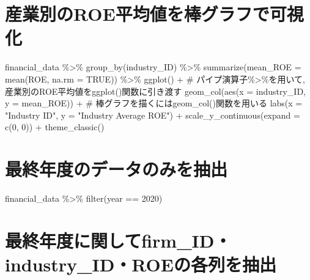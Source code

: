 \documentclass[
  letterpaper,
  DIV=11,
  numbers=noendperiod]{scrreprt}
\newenvironment{Shaded}{\begin{snugshade}}{\end{snugshade}}
\newcommand{\AttributeTok}[1]{\textcolor[rgb]{0.40,0.45,0.13}{#1}}
\newcommand{\CommentTok}[1]{\textcolor[rgb]{0.37,0.37,0.37}{#1}}
\newcommand{\ConstantTok}[1]{\textcolor[rgb]{0.56,0.35,0.01}{#1}}
\newcommand{\DecValTok}[1]{\textcolor[rgb]{0.68,0.00,0.00}{#1}}
\newcommand{\FunctionTok}[1]{\textcolor[rgb]{0.28,0.35,0.67}{#1}}
\newcommand{\NormalTok}[1]{\textcolor[rgb]{0.00,0.23,0.31}{#1}}
\newcommand{\SpecialCharTok}[1]{\textcolor[rgb]{0.37,0.37,0.37}{#1}}
\newcommand{\StringTok}[1]{\textcolor[rgb]{0.13,0.47,0.30}{#1}}
\begin{document}
\section{産業別のROE平均値を棒グラフで可視化}\label{ux7523ux696dux5225ux306eroeux5e73ux5747ux5024ux3092ux68d2ux30b0ux30e9ux30d5ux3067ux53efux8996ux5316}

\begin{Shaded}
\begin{Highlighting}[]
\NormalTok{financial\_data }\SpecialCharTok{\%\textgreater{}\%}
  \FunctionTok{group\_by}\NormalTok{(industry\_ID) }\SpecialCharTok{\%\textgreater{}\%}
  \FunctionTok{summarize}\NormalTok{(}\AttributeTok{mean\_ROE =} \FunctionTok{mean}\NormalTok{(ROE, }\AttributeTok{na.rm =} \ConstantTok{TRUE}\NormalTok{)) }\SpecialCharTok{\%\textgreater{}\%}
  \FunctionTok{ggplot}\NormalTok{() }\SpecialCharTok{+} \CommentTok{\# パイプ演算子\%\textgreater{}\%を用いて, 産業別のROE平均値をggplot()関数に引き渡す}
  \FunctionTok{geom\_col}\NormalTok{(}\FunctionTok{aes}\NormalTok{(}\AttributeTok{x =}\NormalTok{ industry\_ID, }\AttributeTok{y =}\NormalTok{ mean\_ROE)) }\SpecialCharTok{+} \CommentTok{\# 棒グラフを描くにはgeom\_col()関数を用いる}
  \FunctionTok{labs}\NormalTok{(}\AttributeTok{x =} \StringTok{"Industry ID"}\NormalTok{, }\AttributeTok{y =} \StringTok{"Industry Average ROE"}\NormalTok{) }\SpecialCharTok{+} 
  \FunctionTok{scale\_y\_continuous}\NormalTok{(}\AttributeTok{expand =} \FunctionTok{c}\NormalTok{(}\DecValTok{0}\NormalTok{, }\DecValTok{0}\NormalTok{)) }\SpecialCharTok{+} 
  \FunctionTok{theme\_classic}\NormalTok{()}
\end{Highlighting}
\end{Shaded}

\section{最終年度のデータのみを抽出}\label{ux6700ux7d42ux5e74ux5ea6ux306eux30c7ux30fcux30bfux306eux307fux3092ux62bdux51fa}

\begin{Shaded}
\begin{Highlighting}[]
\NormalTok{financial\_data }\SpecialCharTok{\%\textgreater{}\%} 
  \FunctionTok{filter}\NormalTok{(year }\SpecialCharTok{==} \DecValTok{2020}\NormalTok{)}
\end{Highlighting}
\end{Shaded}

\section{最終年度に関してfirm\_ID・industry\_ID・ROEの各列を抽出}\label{ux6700ux7d42ux5e74ux5ea6ux306bux95a2ux3057ux3066firm_idindustry_idroeux306eux5404ux5217ux3092ux62bdux51fa}
\end{document}
